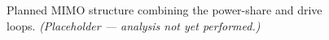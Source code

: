\begin{figure}[H]
    \centering
    \caption{Planned MIMO structure combining the power-share and drive loops.
    \textit{(Placeholder --- analysis not yet performed.)}}
    \label{fig:mimo_block}
\end{figure}

